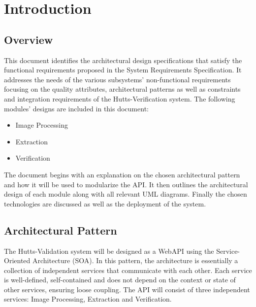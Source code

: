 \documentclass{article}
\begin{document}
\cleardoublepage
\thispagestyle{empty}
\tableofcontents
\newpage

\setcounter{page}{1}
	\section{Introduction}
	\subsection{Overview}
This document identifies the architectural design specifications that satisfy the functional requirements proposed in the System Requirements Specification. It addresses the needs of the various subsystems' non-functional requirements focusing on the quality attributes, architectural patterns as well as constraints and integration requirements of the Hutts-Verification system.\newline \newline 
The following modules' designs are included in this document:
\begin{itemize}
	\item Image Processing
	\item Extraction
	\item Verification
\end{itemize}
The document begins with an explanation on the chosen architectural pattern and how it will be used to modularize the API. It then outlines the architectural design of each module along with all relevant UML diagrams. Finally the chosen technologies are discussed as well as the deployment of the system. 

\subsection{Architectural Pattern}
The Hutts-Validation system will be designed as a WebAPI using the Service-Oriented Architecture (SOA). In this pattern, the architecture is essentially a collection of independent services that communicate with each other. Each service is well-defined, self-contained and does not depend on the context or state of other services, ensuring loose coupling. The API will consist of three independent services: Image Processing, Extraction and Verification. 
\end{document}
